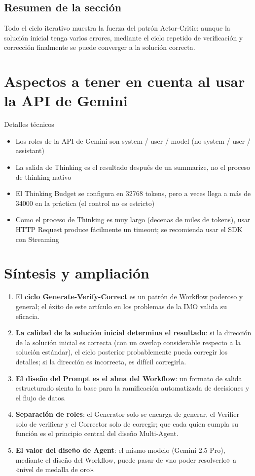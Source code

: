 \documentclass[a4paper]{article}
\begin{document}
\subsection{Resumen de la sección}

Todo el ciclo iterativo muestra la fuerza del patrón Actor-Critic: aunque la solución inicial tenga varios errores, mediante el ciclo repetido de verificación y corrección finalmente se puede converger a la solución correcta.

\section{Aspectos a tener en cuenta al usar la API de Gemini}

\begin{knowledgebox}{Detalles técnicos}
\begin{itemize}
    \item Los roles de la API de Gemini son system / user / model (no system / user / assistant)
    \item La salida de Thinking es el resultado después de un summarize, no el proceso de thinking nativo
    \item El Thinking Budget se configura en 32768 tokens, pero a veces llega a más de 34000 en la práctica (el control no es estricto)
    \item Como el proceso de Thinking es muy largo (decenas de miles de tokens), usar HTTP Request produce fácilmente un timeout; se recomienda usar el SDK con Streaming
\end{itemize}
\end{knowledgebox}
\section{Síntesis y ampliación}

\begin{enumerate}
    \item El \textbf{ciclo Generate-Verify-Correct} es un patrón de Workflow poderoso y general; el éxito de este artículo en los problemas de la IMO valida su eficacia.
    \item \textbf{La calidad de la solución inicial determina el resultado}: si la dirección de la solución inicial es correcta (con un overlap considerable respecto a la solución estándar), el ciclo posterior probablemente pueda corregir los detalles; si la dirección es incorrecta, es difícil corregirla.
    \item \textbf{El diseño del Prompt es el alma del Workflow}: un formato de salida estructurado sienta la base para la ramificación automatizada de decisiones y el flujo de datos.
    \item \textbf{Separación de roles}: el Generator solo se encarga de generar, el Verifier solo de verificar y el Corrector solo de corregir; que cada quien cumpla su función es el principio central del diseño Multi-Agent.
    \item \textbf{El valor del diseño de Agent}: el mismo modelo (Gemini 2.5 Pro), mediante el diseño del Workflow, puede pasar de «no poder resolverlo» a «nivel de medalla de oro».
\end{enumerate}
\end{document}
